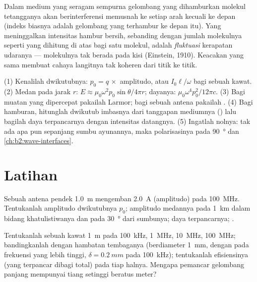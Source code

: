 \begin{remark}\label{rem:b2:dipole-radiation:why}
Dalam medium yang seragam sempurna gelombang yang dihamburkan molekul
tetangganya akan berinterferensi memusnah ke setiap arah kecuali ke depan
(indeks biasnya adalah gelombang yang terhambur ke depan itu). Yang
meninggalkan intensitas hambur bersih, sebanding dengan jumlah
molekulnya seperti yang dihitung di atas bagi satu molekul, adalah \emph{fluktuasi} kerapatan udaranya
--- molekulnya tak berada pada kisi (Einstein, 1910). Keacakan
yang sama membuat cahaya langitnya tak koheren dari titik ke titik.
\end{remark}

\begin{method}\label{met:b2:dipole-radiation:method}
(1) Kenalilah dwikutubnya: $p_0 = q\,\times$ amplitudo, atau $I_0\ell/\omega$ bagi sebuah
kawat. (2) Medan pada jarak $r$: $E \approx \mu_0\omega^2p_0\sin\theta/4\pi r$; dayanya:
$\mu_0\omega^4p_0^2/12\pi c$. (3) Bagi muatan yang dipercepat pakailah Larmor; bagi
sebuah antena pakailah . (4) Bagi hamburan, hitunglah
dwikutub imbasnya dari tanggapan mediumnya () lalu bagilah
daya terpancarnya dengan intensitas datangnya. (5) Ingatlah nolnya:
tak ada apa pun sepanjang sumbu ayunannya, maka polarisasinya pada
\qty{90}{\degree} dan  \cref{ch:b2:wave-interfaces}.
\end{method}

\section{Latihan}

\begin{exercise}[$\star$]\label{exo:b2:dipole-radiation:1}
Sebuah antena pendek \qty{1.0}{m} mengemban \qty{2.0}{A} (amplitudo) pada
\qty{100}{MHz}. Tentukanlah amplitudo dwikutubnya $p_0$; amplitudo medannya pada \qty{1}{km} dalam
bidang khatulistiwanya dan pada \qty{30}{\degree} dari sumbunya; daya terpancarnya;
.
\end{exercise}

\begin{exercise}[$\star$]\label{exo:b2:dipole-radiation:2}
Tentukanlah  sebuah kawat \qty{1}{m} pada \qty{100}{kHz}, \qty{1}{MHz},
\qty{10}{MHz}, \qty{100}{MHz}; bandingkanlah dengan hambatan tembaganya
(berdiameter \qty{1}{mm}, dengan  pada frekuensi yang lebih tinggi,
$\delta = \qty{0.2}{mm}$ pada \qty{100}{kHz}); tentukanlah efisiensinya (yang terpancar dibagi total)
pada tiap halnya. Mengapa pemancar gelombang panjang mempunyai tiang setinggi beratus
meter?
\end{exercise}


